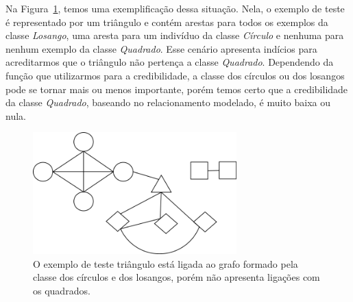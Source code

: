 
Na Figura~\ref{fig::grafo}, temos uma exemplificação dessa situação. Nela, o exemplo de teste é representado por um triângulo e contém arestas para todos os exemplos da classe \textit{Losango}, uma aresta para um indivíduo da classe \textit{Círculo} e nenhuma para nenhum exemplo da classe \textit{Quadrado}. Esse cenário apresenta indícios para acreditarmos que o triângulo não pertença a classe \textit{Quadrado}. Dependendo da função que utilizarmos para a credibilidade, a classe dos círculos ou dos losangos pode se tornar mais ou menos importante, porém temos certo que a credibilidade da classe \textit{Quadrado}, baseando no relacionamento modelado, é muito baixa ou nula. 


\begin{figure}[ht!]
\centering
\includegraphics[width=0.7\textwidth]{figures/grafo.png}
\caption{O exemplo de teste triângulo está ligada ao grafo formado pela classe dos círculos e dos losangos, porém não apresenta ligações com os quadrados.}
\label{fig::grafo}
\end{figure}


